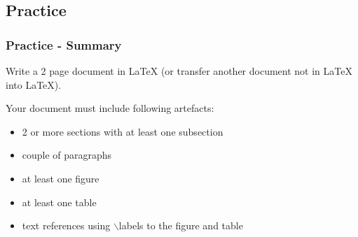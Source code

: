 \documentclass[slidestop,compress,mathserif]{beamer}
\begin{document}
\subsection[Practice]{Practice}
\begin{frame}
		\frametitle{Practice - Summary}

		Write a 2 page document in LaTeX (or transfer another document not in LaTeX into LaTeX).
		\vspace{0.5cm}
		
		Your document must include following artefacts:\\
		\begin{itemize}
			\item 2 or more sections with at least one subsection
			\item couple of paragraphs 
			\item at least one figure
			\item at least one table
			\item text references using {\color{command}$\backslash$label}s to the figure and table
		\end{itemize}
	
\end{frame}
\end{document}

